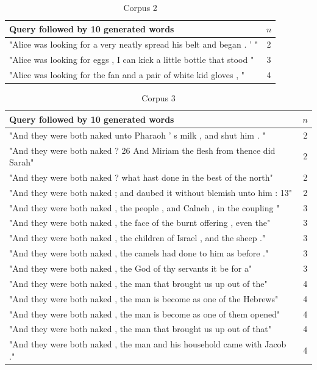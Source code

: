 \documentclass[a4paper,12pt]{article}
\begin{document}
\begin{table}
\small
\begin{tabular}{| l |c|}
\hline
Query followed by 10 generated words & $n$ \\ \hline
"Alice was looking for a very neatly spread his belt and began . ' " & 2\\ \hline
"Alice was looking for eggs , I can kick a little bottle that stood "& 3 \\ \hline
"Alice was looking for the fan and a pair of white kid gloves , " & 4 \\ \hline
\end{tabular}
\caption{Corpus 2}
\label{tab:corpus2}
\end{table}
\begin{table}
\small
\begin{tabular}{| l |c|}
\hline
Query followed by 10 generated words & $n$ \\ \hline
"And they were both naked unto Pharaoh ' s milk , and shut him . " & 2\\ \hline
"And they were both naked ? 26 And Miriam the flesh from thence did Sarah"& 2 \\ \hline
"And they were both naked ? what hast done in the best of the north" & 2 \\ \hline
"And they were both naked ; and daubed it without blemish unto him : 13" & 2 \\ \hline

"And they were both naked , the people , and Calneh , in the coupling " & 3 \\ \hline
"And they were both naked , the face of the burnt offering , even the" & 3 \\ \hline
"And they were both naked , the children of Israel , and the sheep ." & 3 \\ \hline
"And they were both naked , the camels had done to him as before ." & 3 \\ \hline
"And they were both naked , the God of thy servants it be for a" & 3 \\ \hline

"And they were both naked , the man that brought us up out of the" & 4 \\ \hline
"And they were both naked , the man is become as one of the Hebrews" & 4 \\ \hline
"And they were both naked , the man is become as one of them opened" & 4 \\ \hline
"And they were both naked , the man that brought us up out of that" & 4 \\ \hline
"And they were both naked , the man and his household came with Jacob ." & 4 \\ \hline

\end{tabular}
\caption{ Corpus 3}
\label{tab:corpus3}
\end{table}
\end{document}
